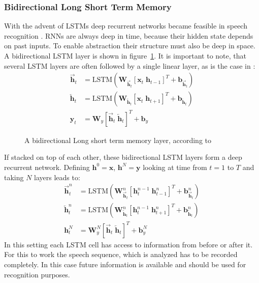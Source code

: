 \subsubsection{Bidirectional Long Short Term Memory}
With the advent of LSTMs deep recurrent networks became feasible in speech recognition \cite{Graves2013b}. RNNs are always deep in time, because their hidden state depends on past inputs. To enable abstraction their structure must also be deep in space. A bidirectional LSTM layer is shown in figure~\ref{fig:blstm}. It is important to note, that several LSTM layers are often followed by a single linear layer, as is the case in \cite{Graves2013b}:
\begin{align}
\overrightarrow{\mathbf{h}}_t &= \text{LSTM}(\mathbf{W}_{\overrightarrow{\mathbf{h}}_t} [\mathbf{x}_t \; \mathbf{h}_{t-1}]^T + \mathbf{b}_{\overrightarrow{\mathbf{h}}_t})
\\
\overleftarrow{\mathbf{h}}_t &= \text{LSTM}(\mathbf{W}_{\overleftarrow{\mathbf{h}}_t} [\mathbf{x}_t \; \mathbf{h}_{t+1}]^T + \mathbf{b}_{\overleftarrow{\mathbf{h}}_t})
\\
\mathbf{y}_t &= \mathbf{W}_{y} [\overrightarrow{\mathbf{h}}_t \; \overleftarrow{\mathbf{h}}_t]^T + \mathbf{b}_y
\end{align}
\begin{figure}
\centering

\caption{A bidirectional Long short term memory layer, according to \cite{Graves2013b} }
\label{fig:blstm}
\end{figure}
If stacked on top of each other, these bidirectional LSTM layers form a deep recurrent network. Defining $\mathbf{h}^0 = \mathbf{x}$, $\mathbf{h}^N = \mathbf{y}$ looking at time from $t = 1$ to $T$ and taking $N$ layers leads to:
\begin{align}
\overrightarrow{\mathbf{h}}_t^n &= \text{LSTM}(\mathbf{W}_{\overrightarrow{\mathbf{h}}_t}^n [\mathbf{h}_t^{n-1} \; \mathbf{h}_{t-1}^n]^T + \mathbf{b}_{\overrightarrow{\mathbf{h}}_t}^n)
\\
\overleftarrow{\mathbf{h}}_t^n &= \text{LSTM}(\mathbf{W}_{\overleftarrow{\mathbf{h}}_t}^n [\mathbf{h}_t^{n-1} \; \mathbf{h}_{t+1}^n]^T + \mathbf{b}_{\overleftarrow{\mathbf{h}}_t}^n)
\\
\mathbf{h}_t^N &= \mathbf{W}_{y}^N [\overrightarrow{\mathbf{h}}_t \; \overleftarrow{\mathbf{h}}_t]^T + \mathbf{b}_y^N
\end{align}
In this setting each LSTM cell has access to information from before or after it. For this to work the speech sequence, which is analyzed has to be recorded completely. In this case future information is available and should be used for recognition purposes.

